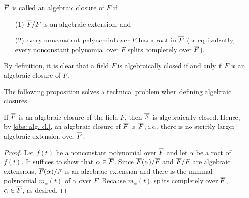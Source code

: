 \begin{defi}
    $\overline{F}$ is called an algebraic closure of $F$ if
    \begin{enumerate}
        \item[(1)]
        {
            $\overline{F}/F$ is an algebraic extension, and
        }
        \item[(2)]
        {
            every nonconstant polynomial over $F$ has a root in $\overline{F}$ (or equivalently, every nonconstant polynomial over $F$ splits completely over $\overline{F}$).
        }
    \end{enumerate}
\end{defi}
\begin{rmk}
    By definition, it is clear that a field $F$ is algebraically closed if and only if $F$ is an algebraic closure of $F$.
\end{rmk}
The following proposition solves a technical problem when defining algebraic closures.
\begin{prop}
    If $\overline{F}$ is an algebraic closure of the field $F$, then $\overline{F}$ is algebraically closed.
    Hence, by \cref{obs: alg. cl.}, an algebraic closure of $\overline{F}$ is $\overline{F}$, i.e., there is no strictly larger algebraic extension over $\overline{F}$.
\end{prop}
\begin{proof}
    Let $f(t)$ be a nonconstant polynomial over $\overline{F}$ and let $\alpha$ be a root of $f(t)$.
    It suffices to show that $\alpha\in\overline{F}$.
    Since $\overline{F}(\alpha)/\overline{F}$ and $\overline{F}/F$ are algebraic extensions, $\overline{F}(\alpha)/F$ is an algebraic extension and there is the minimal polynomial $m_\alpha(t)$ of $\alpha$ over $F$.
    Because $m_\alpha(t)$ splits completely over $\overline{F}$, $\alpha\in\overline{F}$, as desired.
\end{proof}

